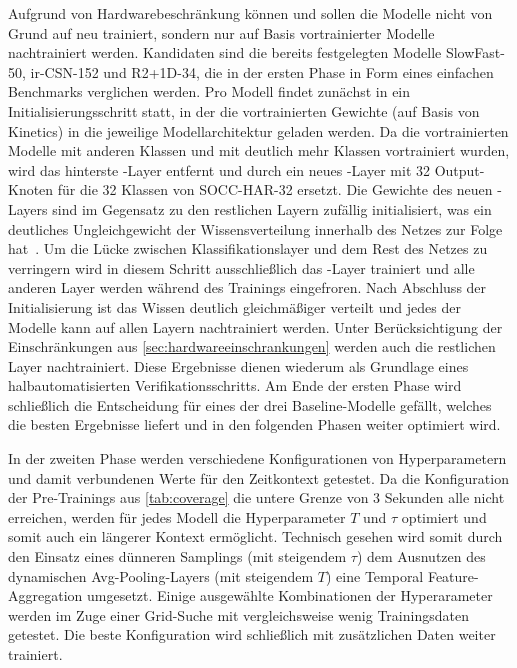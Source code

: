 Aufgrund von Hardwarebeschränkung können und sollen die Modelle nicht von Grund auf neu trainiert, sondern nur auf Basis vortrainierter Modelle nachtrainiert werden.
Kandidaten sind die bereits festgelegten Modelle SlowFast-50, ir-CSN-152 und R2+1D-34, die in der ersten Phase in Form eines einfachen Benchmarks verglichen werden.
Pro Modell findet zunächst in ein Initialisierungsschritt statt, in der die vortrainierten Gewichte (auf Basis von Kinetics) in die jeweilige Modellarchitektur geladen werden.
Da die vortrainierten Modelle mit anderen Klassen und mit deutlich mehr Klassen vortrainiert wurden, wird das hinterste \fc-Layer entfernt und durch ein neues \fc-Layer mit 32 Output-Knoten für die 32 Klassen von SOCC-HAR-32 ersetzt.
Die Gewichte des neuen \fc-Layers sind im Gegensatz zu den restlichen Layern zufällig initialisiert, was ein deutliches Ungleichgewicht der Wissensverteilung innerhalb des Netzes zur Folge hat~\cite{Gugger20}.
Um die Lücke zwischen Klassifikationslayer und dem Rest des Netzes zu verringern wird in diesem Schritt ausschließlich das \fc-Layer trainiert und alle anderen Layer werden während des Trainings eingefroren.
Nach Abschluss der Initialisierung ist das Wissen deutlich gleichmäßiger verteilt und jedes der Modelle kann auf allen Layern nachtrainiert werden.
Unter Berücksichtigung der Einschränkungen aus \autoref{sec:hardwareeinschrankungen} werden auch die restlichen Layer nachtrainiert.
Diese Ergebnisse dienen wiederum als Grundlage eines halbautomatisierten Verifikationsschritts.
Am Ende der ersten Phase wird schließlich die Entscheidung für eines der drei Baseline-Modelle gefällt, welches die besten Ergebnisse liefert und in den folgenden Phasen weiter optimiert wird.

In der zweiten Phase werden verschiedene Konfigurationen von Hyperparametern und damit verbundenen Werte für den Zeitkontext getestet.
Da die Konfiguration der Pre-Trainings aus \autoref{tab:coverage} die untere Grenze von 3 Sekunden alle nicht erreichen, werden für jedes Modell die Hyperparameter $T$ und $\tau$ optimiert und somit auch ein längerer Kontext ermöglicht.
Technisch gesehen wird somit durch den Einsatz eines dünneren Samplings (mit steigendem $\tau$) \bzw dem Ausnutzen des dynamischen Avg-Pooling-Layers (mit steigendem $T$) eine Temporal Feature-Aggregation umgesetzt.
Einige ausgewählte Kombinationen der Hyperarameter werden im Zuge einer Grid-Suche mit vergleichsweise wenig Trainingsdaten getestet.
Die beste Konfiguration wird schließlich mit zusätzlichen Daten weiter trainiert.

